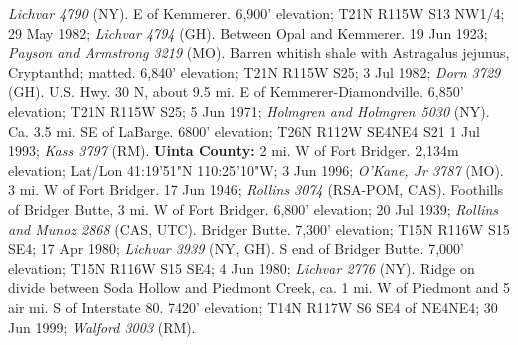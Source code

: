\textit{Lichvar 4790} (NY).
E of Kemmerer. 6,900' elevation; T21N R115W S13 NW1/4; 29 May 1982;
\textit{Lichvar 4794} (GH).
Between Opal and Kemmerer. 19 Jun 1923; \textit{Payson and Armstrong 3219} (MO).
Barren whitish shale with Astragalus jejunus, Cryptanthd; matted.
6,840' elevation; T21N R115W S25; 3 Jul 1982; \textit{Dorn 3729} (GH).
U.S. Hwy. 30 N, about 9.5 mi. E of Kemmerer-Diamondville. 6,850' elevation;
T21N R115W S25; 5 Jun 1971; \textit{Holmgren and Holmgren 5030} (NY).
Ca. 3.5 mi. SE of LaBarge. 6800' elevation; T26N R112W SE4NE4 S21 1 Jul 1993;
\textit{Kass 3797} (RM).
  \textbf{Uinta County:}
2 mi. W of Fort Bridger. 2,134m elevation; Lat/Lon 41:19'51"N 110:25'10"W;
3 Jun 1996; \textit{O'Kane, Jr 3787} (MO).
3 mi. W of Fort Bridger. 17 Jun 1946; \textit{Rollins 3074} (RSA-POM, CAS).
Foothills of Bridger Butte, 3 mi. W of Fort Bridger. 6,800' elevation;
20 Jul 1939; \textit{Rollins and Munoz 2868} (CAS, UTC).
Bridger Butte. 7,300' elevation; T15N R116W S15 SE4; 17 Apr 1980;
\textit{Lichvar 3939} (NY, GH).
S end of Bridger Butte. 7,000' elevation; T15N R116W S15 SE4; 4 Jun 1980;
\textit{Lichvar 2776} (NY).
Ridge on divide between Soda Hollow and Piedmont Creek, ca. 1 mi. W of Piedmont
and 5 air mi. S of Interstate 80. 7420' elevation; T14N R117W S6 SE4 of NE4NE4;
30 Jun 1999; \textit{Walford 3003} (RM).

